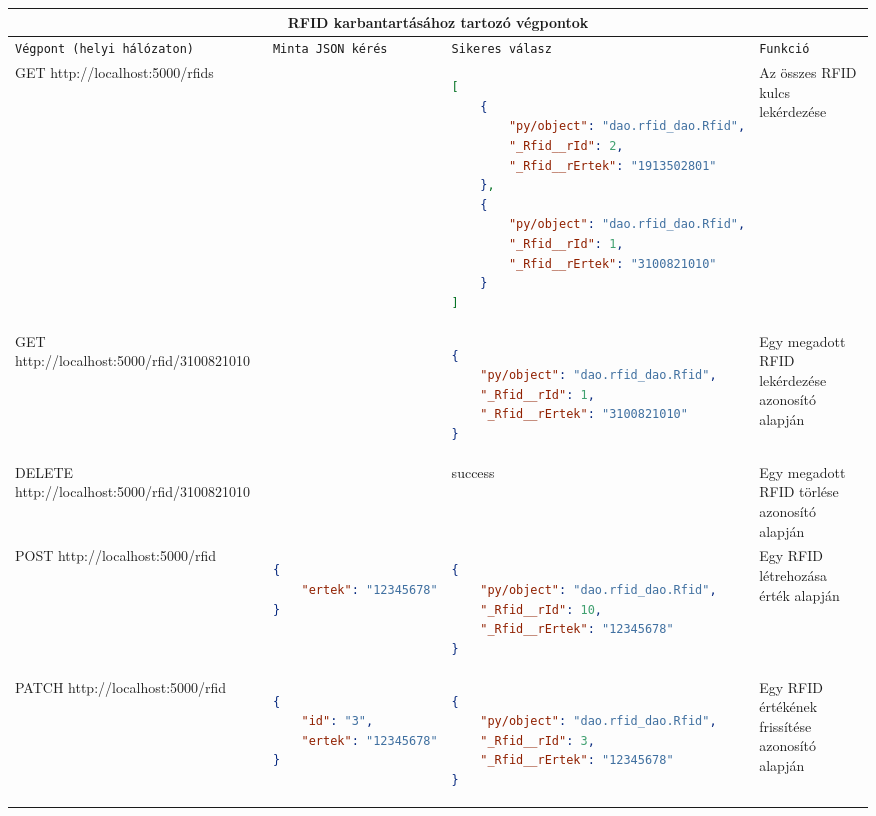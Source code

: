 \documentclass[11pt, a4paper]{article}
\begin{document}
				\begin{minipage}{\linewidth}
	\fontsize{6}{8}\selectfont
	\centering
	\begin{tabular}{|m{20em} | m{12em} | m{20em} | m{10em}|}
		\hline
		\multicolumn{4}{|c|}{\textbf{RFID karbantartásához tartozó végpontok}} \\
		\hline
		\texttt{Végpont \newline{} (helyi hálózaton)} & \texttt{Minta JSON kérés} & \texttt{Sikeres válasz} & \texttt{Funkció} \\
		\hline
		GET \newline{} http://localhost:5000/rfids &  &
		\fontsize{6}{2}\selectfont \begin{lstlisting}[language=json]
[
	{
		"py/object": "dao.rfid_dao.Rfid",
		"_Rfid__rId": 2,
		"_Rfid__rErtek": "1913502801"
	},
	{
		"py/object": "dao.rfid_dao.Rfid",
		"_Rfid__rId": 1,
		"_Rfid__rErtek": "3100821010"
	}
]
		\end{lstlisting}
		& Az összes RFID kulcs lekérdezése \\
		\hline
		GET \newline{} http://localhost:5000/rfid/3100821010 &  &
		\fontsize{6}{2}\selectfont \begin{lstlisting}[language=json]
{
	"py/object": "dao.rfid_dao.Rfid",
	"_Rfid__rId": 1,
	"_Rfid__rErtek": "3100821010"
}
		\end{lstlisting}
		& Egy megadott RFID lekérdezése azonosító alapján \\
		\hline
		DELETE \newline{} http://localhost:5000/rfid/3100821010 &  & success
		& Egy megadott RFID törlése azonosító alapján \\
		\hline
		POST \newline{} http://localhost:5000/rfid &
		\fontsize{6}{2}\selectfont \begin{lstlisting}[language=json]
{
	"ertek": "12345678"
}
		\end{lstlisting}
		&
		\fontsize{6}{2}\selectfont \begin{lstlisting}[language=json]
{
	"py/object": "dao.rfid_dao.Rfid",
	"_Rfid__rId": 10,
	"_Rfid__rErtek": "12345678"
}
		\end{lstlisting}
		& Egy RFID létrehozása érték alapján \\
		\hline
		PATCH \newline{} http://localhost:5000/rfid &
		\fontsize{6}{2}\selectfont \begin{lstlisting}[language=json]
{
	"id": "3",
	"ertek": "12345678"
}
		\end{lstlisting}
		&
		\fontsize{6}{2}\selectfont \begin{lstlisting}[language=json]
{
	"py/object": "dao.rfid_dao.Rfid",
	"_Rfid__rId": 3,
	"_Rfid__rErtek": "12345678"
}
		\end{lstlisting}
		& Egy RFID értékének frissítése azonosító alapján \\
		\hline
	\end{tabular}
	\label{table:6}
\end{minipage}
\end{document}
